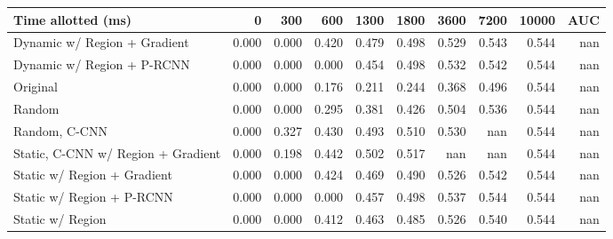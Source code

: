 \begin{tabular}{lrrrrrrrrr}
\toprule
Time allotted (ms) &     0 &   300 &   600 &  1300 &  1800 &  3600 &  7200 &  10000 &  AUC \\
\midrule
Dynamic w/ Region + Gradient       & 0.000 & 0.000 & 0.420 & 0.479 & 0.498 & 0.529 & 0.543 &  0.544 &  nan \\
Dynamic w/ Region + P-RCNN         & 0.000 & 0.000 & 0.000 & 0.454 & 0.498 & 0.532 & 0.542 &  0.544 &  nan \\
Original                           & 0.000 & 0.000 & 0.176 & 0.211 & 0.244 & 0.368 & 0.496 &  0.544 &  nan \\
Random                             & 0.000 & 0.000 & 0.295 & 0.381 & 0.426 & 0.504 & 0.536 &  0.544 &  nan \\
Random, C-CNN                      & 0.000 & 0.327 & 0.430 & 0.493 & 0.510 & 0.530 &   nan &  0.544 &  nan \\
Static, C-CNN w/ Region + Gradient & 0.000 & 0.198 & 0.442 & 0.502 & 0.517 &   nan &   nan &  0.544 &  nan \\
Static w/ Region + Gradient        & 0.000 & 0.000 & 0.424 & 0.469 & 0.490 & 0.526 & 0.542 &  0.544 &  nan \\
Static w/ Region + P-RCNN          & 0.000 & 0.000 & 0.000 & 0.457 & 0.498 & 0.537 & 0.544 &  0.544 &  nan \\
Static w/ Region                   & 0.000 & 0.000 & 0.412 & 0.463 & 0.485 & 0.526 & 0.540 &  0.544 &  nan \\
\bottomrule
\end{tabular}

